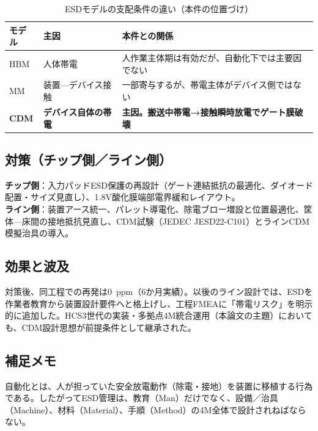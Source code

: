 \documentclass[journal,twocolumn]{IEEEtran}
\begin{document}
\begin{table}[t]
\caption{ESDモデルの支配条件の違い（本件の位置づけ）}
\centering
\begin{tabularx}{\columnwidth}{@{}l l X@{}}
\toprule
モデル & 主因 & 本件との関係 \\
\midrule
HBM & 人体帯電 & 人作業主体期は有効だが、自動化下では主要因でない \\
MM & 装置—デバイス接触 & 一部寄与するが、帯電主体がデバイス側ではない \\
\textbf{CDM} & \textbf{デバイス自体の帯電} & \textbf{主因。搬送中帯電→接触瞬時放電でゲート膜破壊} \\
\bottomrule
\end{tabularx}
\end{table}

\subsection{対策（チップ側／ライン側）}
\textbf{チップ側}：入力パッドESD保護の再設計（ゲート連結抵抗の最適化、ダイオード配置・サイズ見直し）、1.8V酸化膜端部電界緩和レイアウト。\\
\textbf{ライン側}：装置アース統一、パレット導電化、除電ブロー増設と位置最適化、筐体—床間の接地抵抗見直し、CDM試験（JEDEC JESD22-C101）とラインCDM模擬治具の導入。

\subsection{効果と波及}
対策後、同工程での再発は0~ppm（6か月実績）。以後のライン設計では、ESDを作業者教育から装置設計要件へと格上げし、工程FMEAに「帯電リスク」を明示的に追加した。HCS3世代の実装・多拠点4M統合運用（本論文の主題）においても、CDM設計思想が前提条件として継承された。

\subsection*{補足メモ}
自動化とは、人が担っていた安全放電動作（除電・接地）を装置に移植する行為である。したがってESD管理は、教育（Man）だけでなく、設備／治具（Machine）、材料（Material）、手順（Method）の4M全体で設計されねばならない。
\end{document}
